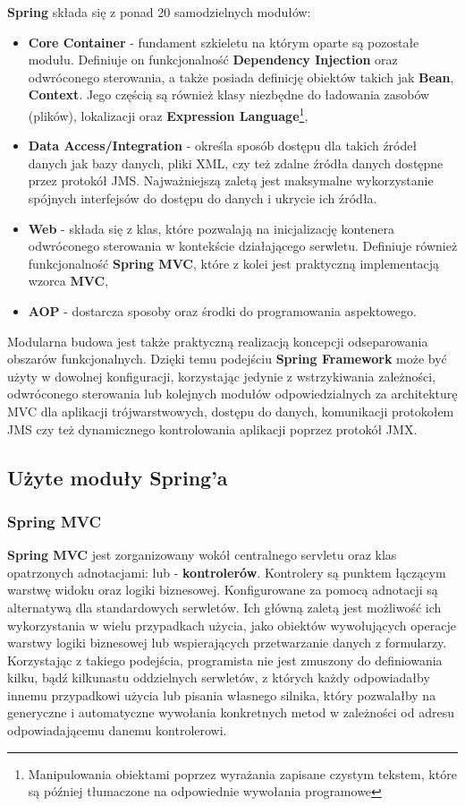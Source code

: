 	 \textbf{Spring} składa się z ponad 20 samodzielnych modułów:
	 \begin{itemize}
	 	\item \textbf{Core Container} - fundament szkieletu na którym oparte są pozostałe modułu. Definiuje on funkcjonalność \textbf{Dependency Injection} oraz odwróconego sterowania, a także posiada definicję obiektów takich jak \textbf{Bean}, \textbf{Context}. Jego częścią są również klasy niezbędne do ładowania zasobów (plików), lokalizacji oraz \textbf{Expression Language}\footnote{Manipulowania obiektami poprzez wyrażania zapisane czystym tekstem, które są później tłumaczone na odpowiednie wywołania programowe},
	 	\item \textbf{Data Access/Integration} - określa sposób dostępu dla takich źródeł danych jak bazy danych, pliki XML, czy też zdalne źródła danych dostępne przez protokół JMS. Najważniejszą zaletą jest maksymalne wykorzystanie spójnych interfejsów do dostępu do danych i ukrycie ich źródła.  
	 	\item \textbf{Web} - składa się z klas, które pozwalają na inicjalizację kontenera odwróconego sterowania w kontekście działającego serwletu. Definiuje również funkcjonalność \textbf{Spring MVC}, które z kolei jest praktyczną implementacją wzorca \textbf{MVC},
	 	\item \textbf{AOP} - dostarcza sposoby oraz środki do programowania aspektowego.
	 \end{itemize}
	 Modularna budowa jest także praktyczną realizacją koncepcji odseparowania obszarów funkcjonalnych. Dzięki temu podejściu \textbf{Spring Framework} może być użyty w dowolnej konfiguracji, korzystając jedynie z wstrzykiwania zależności, odwróconego sterowania lub kolejnych modułów odpowiedzialnych za architekturę MVC dla aplikacji trójwarstwowych, dostępu do danych, komunikacji protokołem JMS czy też dynamicznego kontrolowania aplikacji poprzez protokół JMX. 
		
	\subsection{Użyte moduły Spring'a}
	
		\subsubsection{Spring MVC}
		\label{app:spring_mvc}
		\textbf{Spring MVC} jest zorganizowany wokół centralnego servletu  oraz klas opatrzonych adnotacjami:  lub  - \textbf{kontrolerów}. Kontrolery są punktem łączącym warstwę widoku oraz logiki biznesowej. Konfigurowane za pomocą adnotacji są alternatywą dla standardowych serwletów. Ich główną zaletą jest możliwość ich wykorzystania w wielu przypadkach użycia, jako obiektów wywołujących operacje warstwy logiki biznesowej lub wspierających przetwarzanie danych z formularzy. Korzystając z takiego podejścia, programista nie jest zmuszony do definiowania kilku, bądź kilkunastu oddzielnych serwletów, z których każdy odpowiadałby innemu przypadkowi użycia lub pisania własnego silnika, który pozwalałby na generyczne i automatyczne wywołania konkretnych metod w zależności od adresu odpowiadającemu danemu kontrolerowi. 
		

